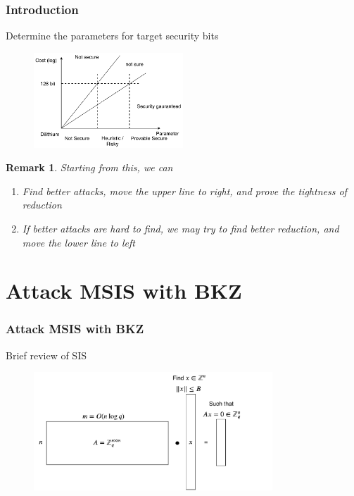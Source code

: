 \documentclass{beamer}
\newtheorem*{remark}{Remark}
\begin{document}
\frame
{
  \frametitle{Introduction}
  Determine the parameters for target security bits
  \begin{figure}[ht!]
  \includegraphics[width=0.5\textwidth]{files/Security-Bits.pdf}
  \end{figure}

  \begin{remark}
    Starting from this, we can
    \begin{enumerate}
    	\item Find better attacks, move the upper line to right, and prove the tightness of reduction
    	\item If better attacks are hard to find, we may try to find better reduction, and move the lower line to left
    \end{enumerate}
  \end{remark}
}

\section{Attack MSIS with BKZ}

\frame
{
  \frametitle{Attack MSIS with BKZ}
  Brief review of SIS
  \begin{figure}[ht!]
  \includegraphics[width=0.8\textwidth]{files/SIS.pdf}
  \end{figure}

}
\end{document}
